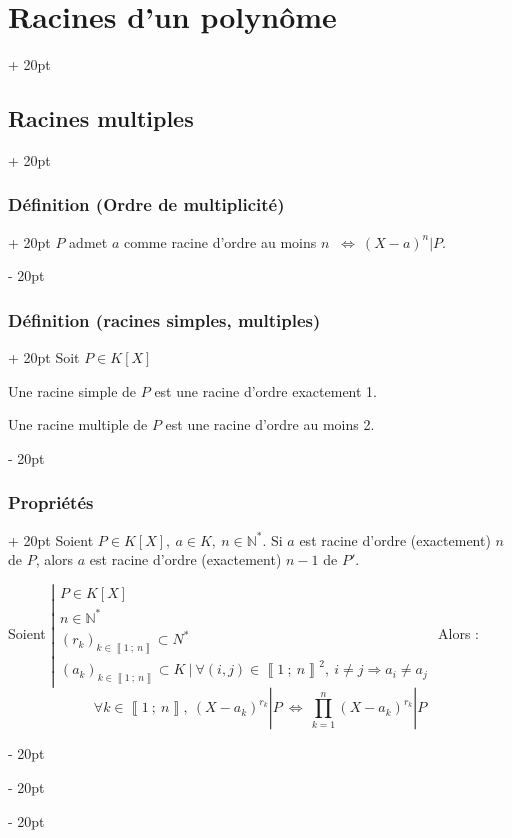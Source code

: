 \documentclass[a4paper, 12pt, twoside]{article}
\newcommand{\N}{\mathbb{N}} %
\newcommand{\nset}[2]{\left\llbracket #1\ ;\ #2 \right\rrbracket}
\newcommand{\ssi}{\ \Leftrightarrow \ }
\newcommand{\ind}[1][20pt]{\advance\leftskip + #1}
\newcommand{\deind}[1][20pt]{\advance\leftskip - #1}
\newenvironment{indt}[2][20pt]{#2 \par \ind[#1]}{\par \deind} %
\begin{document}
\begin{indt}{\section{Racines d'un polynôme}}
\begin{indt}{\subsection{Racines multiples}}
\begin{indt}{\subsubsection{Définition (Ordre de multiplicité)}}
                $P$ admet $a$ comme racine d'ordre au moins $n$ $\ssi (X - a)^n | P$.
            \end{indt}
            
            \vspace{12pt}
            
            \begin{indt}{\subsubsection{Définition (racines simples, multiples)}}
                Soit $P \in K[X]$
                
                Une racine simple de $P$ est une racine d'ordre exactement 1.
                
                Une racine multiple de $P$ est une racine d'ordre au moins 2.
            \end{indt}
            
            \vspace{12pt}
            
            \begin{indt}{\subsubsection{Propriétés}}
                Soient $P \in K[X],\ a \in K,\ n \in \N^*$. Si $a$ est racine d'ordre (exactement) $n$ de $P$, alors $a$ est racine d'ordre (exactement) $n - 1$ de $P'$.
                
                \vspace{6pt}
                
                Soient
                $
                    \left|
                    \begin{array}{l}
                        P \in K[X]
                        \\
                        n \in \N^*
                        \\
                        (r_k)_{k \in \nset 1 n} \subset N^*
                        \\
                        (a_k)_{k \in \nset 1 n} \subset K\ |\ \forall (i, j) \in \nset{1}{n}^2,\ i \neq j \Rightarrow a_i \neq a_j
                    \end{array}
                    \right.
                $
                Alors :
                    \[ \forall k \in \nset 1 n,\ (X - a_k)^{r_k} | P \ssi \prod_{k = 1}^n (X - a_k)^{r_k} | P \]
                

\end{indt}
\end{indt}
\end{indt}
\end{document}
